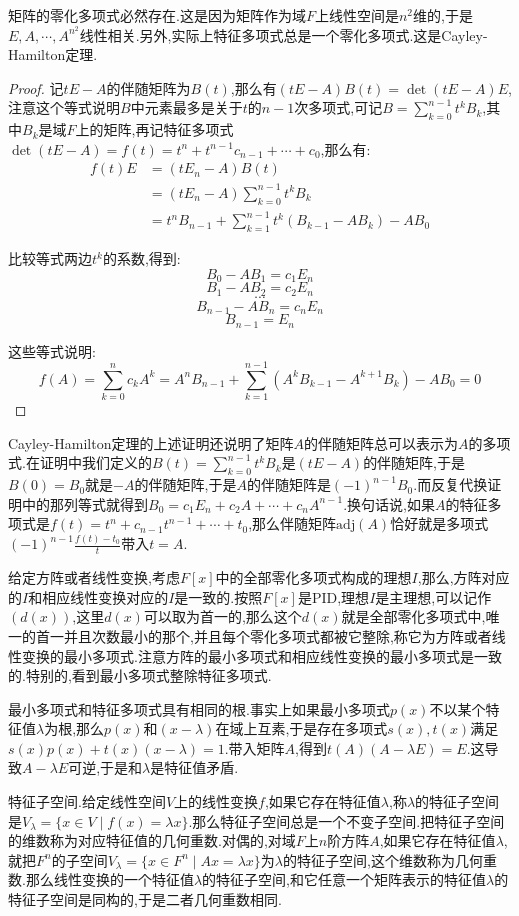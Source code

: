 矩阵的零化多项式必然存在.这是因为矩阵作为域$F$上线性空间是$n^2$维的,于是$E,A,\cdots,A^{n^2}$线性相关.另外,实际上特征多项式总是一个零化多项式.这是Cayley-Hamilton定理.
\begin{proof}

记$tE-A$的伴随矩阵为$B(t)$,那么有$(tE-A)B(t)=\det(tE-A)E$,注意这个等式说明$B$中元素最多是关于$t$的$n-1$次多项式,可记$B=\sum_{k=0}^{n-1}t^kB_k$,其中$B_k$是域$F$上的矩阵,再记特征多项式$\det(tE-A)=f(t)=t^n+t^{n-1}c_{n-1}+\cdots+c_0$,那么有:
\begin{align*}
f(t)E&=(tE_n-A)B(t)\\
&=(tE_n-A)\sum_{k=0}^{n-1}t^kB_k\\
&=t^nB_{n-1}+\sum_{k=1}^{n-1}t^k(B_{k-1}-AB_k)-AB_0
\end{align*}

比较等式两边$t^k$的系数,得到:
$$B_0-AB_1=c_1E_n$$
$$B_1-AB_2=c_2E_n$$
$$\cdots$$
$$B_{n-1}-AB_n=c_nE_n$$
$$B_{n-1}=E_n$$

这些等式说明:
$$f(A)=\sum_{k=0}^nc_kA^k=A^nB_{n-1}+\sum_{k=1}^{n-1}(A^kB_{k-1}-A^{k+1}B_k)-AB_0=0$$
\end{proof}

Cayley-Hamilton定理的上述证明还说明了矩阵$A$的伴随矩阵总可以表示为$A$的多项式.在证明中我们定义的$B(t)=\sum_{k=0}^{n-1}t^kB_k$是$(tE-A)$的伴随矩阵,于是$B(0)=B_0$就是$-A$的伴随矩阵,于是$A$的伴随矩阵是$(-1)^{n-1}B_0$.而反复代换证明中的那列等式就得到$B_0=c_1E_n+c_2A+\cdots+c_nA^{n-1}$.换句话说,如果$A$的特征多项式是$f(t)=t^n+c_{n-1}t^{n-1}+\cdots+t_0$,那么伴随矩阵$\mathrm{adj}(A)$恰好就是多项式$(-1)^{n-1}\frac{f(t)-t_0}{t}$带入$t=A$.

给定方阵或者线性变换,考虑$F[x]$中的全部零化多项式构成的理想$I$,那么,方阵对应的$I$和相应线性变换对应的$I$是一致的.按照$F[x]$是PID,理想$I$是主理想,可以记作$(d(x))$,这里$d(x)$可以取为首一的,那么这个$d(x)$就是全部零化多项式中,唯一的首一并且次数最小的那个,并且每个零化多项式都被它整除,称它为方阵或者线性变换的最小多项式.注意方阵的最小多项式和相应线性变换的最小多项式是一致的.特别的,看到最小多项式整除特征多项式.

最小多项式和特征多项式具有相同的根.事实上如果最小多项式$p(x)$不以某个特征值$\lambda$为根,那么$p(x)$和$(x-\lambda)$在域上互素,于是存在多项式$s(x),t(x)$满足$s(x)p(x)+t(x)(x-\lambda)=1$.带入矩阵$A$,得到$t(A)(A-\lambda E)=E$.这导致$A-\lambda E$可逆,于是和$\lambda$是特征值矛盾.

特征子空间.给定线性空间$V$上的线性变换$f$,如果它存在特征值$\lambda$,称$\lambda$的特征子空间是$V_{\lambda}=\{x\in V\mid f(x)=\lambda x\}$.那么特征子空间总是一个不变子空间.把特征子空间的维数称为对应特征值的几何重数.对偶的,对域$F$上$n$阶方阵$A$,如果它存在特征值$\lambda$,就把$F^n$的子空间$V_{\lambda}=\{x\in F^n\mid Ax=\lambda x\}$为$\lambda$的特征子空间,这个维数称为几何重数.那么线性变换的一个特征值$\lambda$的特征子空间,和它任意一个矩阵表示的特征值$\lambda$的特征子空间是同构的,于是二者几何重数相同.

